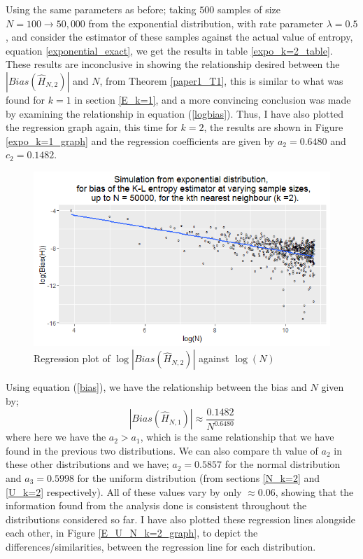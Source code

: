 \documentclass{article}
\begin{document}
Using the same parameters as before; taking $500$ samples of size $N=100 \to 50,000$ from the exponential distribution, with rate parameter $\lambda =0.5$, and consider the estimator of these samples against the actual value of entropy, equation \ref{exponential_exact}, we get the results in table \ref{expo_k=2_table}. These results are inconclusive in showing the relationship desired between the $|Bias(\hat{H}_{N, 2})|$ and $N$, from Theorem \ref{paper1_T1}, this is similar to what was found for $k=1$ in section \ref{E_k=1}, and a more convincing conclusion was made by examining the relationship in equation (\ref{logbias}). Thus, I have also plotted the regression graph again, this time for $k=2$, the results are shown in Figure \ref{expo_k=1_graph} and the regression coefficients are given by $a_{2} = 0.6480$ and $c_{2} = 0.1482$.

\begin{figure}
  \begin{center}
    \includegraphics[width=\textwidth]{./Graphs/Expo_k=2_plot.png}
  \end{center}
\caption{Regression plot of $\log|Bias(\hat{H}_{N, 2})|$ against $\log(N)$}
  \label{expo_k=2_graph}
\end{figure}

Using equation (\ref{bias}), we have the relationship between the bias and $N$ given by;
\begin{equation}
|Bias(\hat{H}_{N, 1})| \approx \frac{0.1482}{N^{0.6480}}\nonumber
\end{equation}
where here we have the $a_{2} > a_{1}$, which is the same relationship that we have found in the previous two distributions. We can also compare th value of $a_{2}$ in these other distributions and we have; $a_{2} = 0.5857$ for the normal distribution and $a_{3}= 0.5998$ for the uniform distribution (from sections \ref{N_k=2} and \ref{U_k=2} respectively). All of these values vary by only $\approx 0.06$, showing that the information found from the analysis done is consistent throughout the distributions considered so far. I have also plotted these regression lines alongside each other, in Figure \ref{E_U_N_k=2_graph}, to depict the differences/similarities, between the regression line for each distribution.
\end{document}
